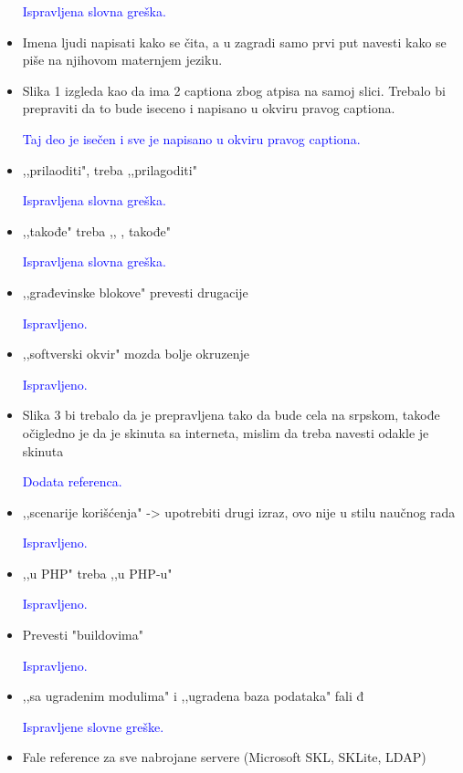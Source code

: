 \documentclass[a4paper]{report}
\newcommand{\odgovor}[1]{\textcolor{blue}{#1}}
\begin{document}
\begin{itemize}
\odgovor{Ispravljena slovna greška.}

\item Imena ljudi napisati kako se čita, a u zagradi samo prvi put navesti kako se piše na njihovom maternjem jeziku.

\odgovor{}

\item Slika 1 izgleda kao da ima 2 captiona zbog atpisa na samoj slici. Trebalo bi prepraviti da to bude iseceno i napisano u okviru pravog captiona.

\odgovor{Taj deo je isečen i sve je napisano u okviru pravog captiona.}

\item ,,prilaoditi", treba ,,prilagoditi" 

\odgovor{Ispravljena slovna greška.}

\item ,,takođe" treba ,, , takođe"

\odgovor{Ispravljena slovna greška.}

\item ,,građevinske blokove" prevesti drugacije

\odgovor{Ispravljeno.}

\item ,,softverski okvir"  mozda bolje okruzenje

\odgovor{Ispravljeno.}

\item Slika 3 bi trebalo da je prepravljena tako da bude cela na srpskom, takođe očigledno je da je skinuta sa interneta, mislim da treba navesti odakle je skinuta

\odgovor{Dodata referenca.}

\item ,,scenarije korišćenja" -> upotrebiti drugi izraz, ovo nije u stilu naučnog rada

\odgovor{Ispravljeno.}

\item ,,u PHP" treba ,,u PHP-u"

\odgovor{Ispravljeno.}

\item Prevesti "buildovima"

\odgovor{Ispravljeno.}

\item ,,sa ugradenim modulima" i ,,ugradena baza podataka" fali đ

\odgovor{Ispravljene slovne greške.}

\item Fale reference za sve nabrojane servere (Microsoft SKL, SKLite, LDAP)


\end{itemize}
\end{document}
